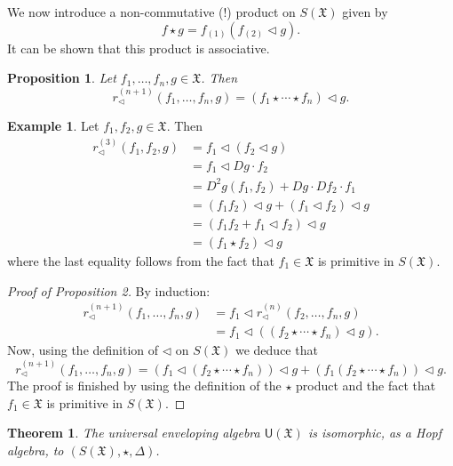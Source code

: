 \documentclass[10pt, reqno]{article}
\theoremstyle{definition}
\newtheorem{example}{Example}
\theoremstyle{plain}
\newtheorem{theorem}{Theorem}
\newtheorem{proposition}{Proposition}
\newcommand{\fX}{\mathfrak{X}}
\begin{document}
We now introduce a non-commutative (!) product on \(S(\fX)\) given by
\[
	f\star g=f_{(1)}(f_{(2)}\triangleleft g).
\]
It can be shown that this product is associative.
\begin{proposition}
	Let \(f_1,\dotsc,f_n,g\in\fX\). Then
	\[
		r^{(n+1)}_{\triangleleft}(f_1,\dotsc,f_n,g)=(f_1\star\dotsm\star f_n)\triangleleft g.
	\]
\end{proposition}

\begin{example}
	Let \(f_1,f_2,g\in\fX\). Then
	\begin{align*}
		r^{(3)}_\triangleleft(f_1,f_2,g)&= f_1\triangleleft(f_2\triangleleft g)\\
		&= f_1\triangleleft Dg\cdot f_2\\
		&= D^2g(f_1,f_2)+Dg\cdot Df_2\cdot f_1\\
		&= (f_1f_2)\triangleleft g+(f_1\triangleleft f_2)\triangleleft g\\
		&= (f_1f_2+f_1\triangleleft f_2)\triangleleft g\\
		&= (f_1\star f_2)\triangleleft g
	\end{align*}
	where the last equality follows from the fact that \(f_1\in\fX\) is primitive in \(S(\fX)\).
\end{example}
\begin{proof}[Proof of Proposition 2]
	By induction:
	\begin{align*}
		r^{(n+1)}_\triangleleft(f_1,\dotsc,f_n,g)&= f_1\triangleleft r^{(n)}_\triangleleft(f_2,\dotsc,f_n,g)\\
		&= f_1\triangleleft ((f_2\star\dotsm\star f_n)\triangleleft g).
	\end{align*}
	Now, using the definition of \(\triangleleft\) on \(S(\fX)\) we deduce that
	\[
		r^{(n+1)}_\triangleleft(f_1,\dotsc,f_n,g)=(f_1\triangleleft(f_2\star\dotsm\star f_n))\triangleleft g + (f_1(f_2\star\dotsm\star f_n))\triangleleft g.
	\]
	The proof is finished by using the definition of the \(\star\) product and the fact that \(f_1\in\fX\) is primitive in
	\(S(\fX)\).
\end{proof}

\begin{theorem}
	The universal enveloping algebra \(\mathsf{U}(\fX)\) is isomorphic, as a Hopf algebra, to \((S(\fX),\star,\Delta)\).
\end{theorem}
\end{document}
